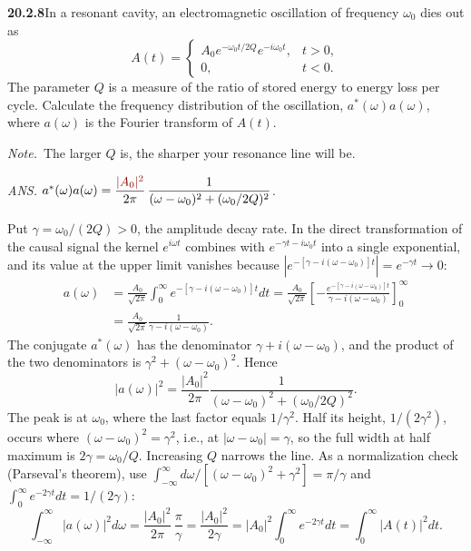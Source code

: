 \par\bigskip
\noindent\textbf{20.2.8}\quad In a resonant cavity, an
electromagnetic oscillation of frequency $\omega_{0}$ dies out as
\[
A(t)=\begin{cases}
A_{0}e^{-\omega_{0}t/2Q}e^{-i\omega_{0}t}, & t>0,\\[3pt]
0, & t<0.
\end{cases}
\]
The parameter $Q$ is a measure of the ratio of stored energy to
energy loss per cycle. Calculate the frequency distribution of the
oscillation, $a^{*}(\omega)a(\omega)$, where $a(\omega)$ is the
Fourier transform of $A(t)$.
\par\emph{Note.}~The larger $Q$ is, the sharper your resonance
line will be.
\par\nobreak\hfill\emph{ANS.}\enspace
$a^{*}(\omega)a(\omega)=\dfrac{\erratum{|A_{0}|^{2}}}{2\pi}\,
\dfrac{1}{(\omega-\omega_{0})^{2}+(\omega_{0}/2Q)^{2}}$.
\par{}
\solution
Put $\gamma=\omega_0/(2Q)>0$, the amplitude decay
rate. In the direct transformation of the causal signal the
kernel $e^{i\omega t}$ combines with $e^{-\gamma t-i\omega_0t}$
into a single exponential, and its value at the upper limit
vanishes because
$|e^{-[\gamma-i(\omega-\omega_0)]t}|=e^{-\gamma t}\to0$:
\begin{align*}
a(\omega)&=\frac{A_0}{\sqrt{2\pi}}\int_0^\infty
 e^{-[\gamma-i(\omega-\omega_0)]t}dt
=\frac{A_0}{\sqrt{2\pi}}\left[
-\frac{e^{-[\gamma-i(\omega-\omega_0)]t}}{\gamma-i(\omega-\omega_0)}
\right]_0^\infty\\
&=\frac{A_0}{\sqrt{2\pi}}
\frac1{\gamma-i(\omega-\omega_0)}.
\end{align*}
The conjugate $a^*(\omega)$ has the denominator
$\gamma+i(\omega-\omega_0)$, and the product of the two
denominators is $\gamma^2+(\omega-\omega_0)^2$. Hence
\[
\boxed{|a(\omega)|^2=\frac{|A_0|^2}{2\pi}
\frac1{(\omega-\omega_0)^2+(\omega_0/2Q)^2}.}
\]
The peak is at $\omega_0$, where the last factor equals
$1/\gamma^2$. Half its height, $1/(2\gamma^2)$, occurs where
$(\omega-\omega_0)^2=\gamma^2$, i.e., at
$|\omega-\omega_0|=\gamma$, so the full width at half maximum
is $2\gamma=\omega_0/Q$. Increasing $Q$ narrows the line.
As a normalization check (Parseval's theorem), use
$\int_{-\infty}^{\infty}d\omega/[(\omega-\omega_0)^2+\gamma^2]=\pi/\gamma$
and $\int_0^\infty e^{-2\gamma t}dt=1/(2\gamma)$:
\[
\int_{-\infty}^{\infty}|a(\omega)|^2d\omega
=\frac{|A_0|^2}{2\pi}\,\frac\pi\gamma=\frac{|A_0|^2}{2\gamma}
=|A_0|^2\int_0^\infty e^{-2\gamma t}dt
=\int_0^\infty|A(t)|^2dt.
\]

